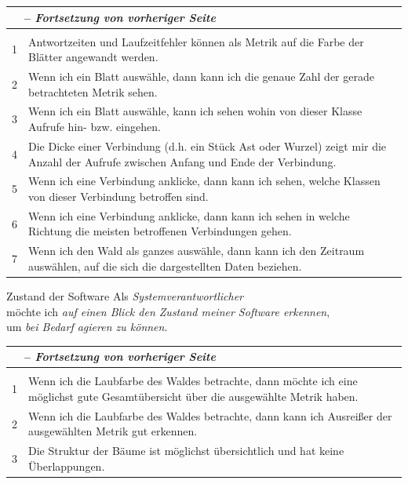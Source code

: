 \newcommand{\tableheader}{
\endfirsthead
\multicolumn{2}{l}{\small \tablename\ \thetable\ -- \textit{Fortsetzung von vorheriger Seite}} \\
\hline
  \endhead
  \hline
  \endlastfoot
  \hline
\multicolumn{2}{r}{\textit{\small Fortsetzung auf nächster Seite...}} \\
\endfoot
\hline
}
\renewcommand{\arraystretch}{1.5}
\begin{tabularx}{\textwidth}{lX} 
	\caption{Akzeptanzkriterien zu Userstory 1}\label{tab:acceptance1} \\
	\tableheader
    1 & Antwortzeiten und Laufzeitfehler können als Metrik auf die Farbe der Blätter angewandt werden.\\
    2 & Wenn ich ein Blatt auswähle, dann kann ich die genaue Zahl der gerade betrachteten Metrik sehen.\\
    3 & Wenn ich ein Blatt auswähle, kann ich sehen wohin von dieser Klasse Aufrufe hin- bzw. eingehen.\\
    4 & Die Dicke einer Verbindung (d.h. ein Stück Ast oder Wurzel) zeigt mir die Anzahl der Aufrufe zwischen Anfang und Ende der Verbindung.\\
    5 & Wenn ich eine Verbindung anklicke, dann kann ich sehen, welche Klassen von dieser Verbindung betroffen sind.\\
    6 & Wenn ich eine Verbindung anklicke, dann kann ich sehen in welche Richtung die meisten betroffenen Verbindungen gehen.\\
    7 & Wenn ich den Wald als ganzes auswähle, dann kann ich den Zeitraum auswählen, auf die sich die dargestellten Daten beziehen.
\end{tabularx}

\begin{userstory}{Zustand der Software}
  Als \textit{Systemverantwortlicher}\\
  möchte ich \textit{auf einen Blick den Zustand meiner Software erkennen},\\
  um \textit{bei Bedarf agieren zu können}.
\end{userstory}

\begin{tabularx}{\textwidth}{lX}
	\caption{Akzeptanzkriterien zu Userstory 2} \\
	\tableheader
    1 & Wenn ich die Laubfarbe des Waldes betrachte, dann möchte ich eine möglichst gute Gesamtübersicht über die ausgewählte Metrik haben.\\
    2 & Wenn ich die Laubfarbe des Waldes betrachte, dann kann ich Ausreißer der ausgewählten Metrik gut erkennen.\\
    3 & Die Struktur der Bäume ist möglichst übersichtlich und hat keine Überlappungen.
\end{tabularx}


